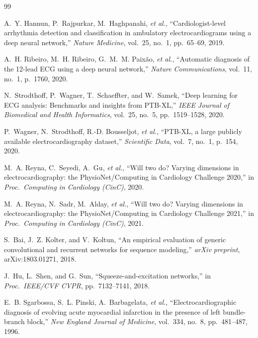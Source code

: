\documentclass[journal]{IEEEtran}
\begin{document}
\begin{thebibliography}{99}

A.~Y. Hannun, P.~Rajpurkar, M.~Haghpanahi, \textit{et al.},
``Cardiologist-level arrhythmia detection and classification in
ambulatory electrocardiograms using a deep neural network,''
\textit{Nature Medicine}, vol.~25, no.~1, pp.~65--69, 2019.

A.~H. Ribeiro, M.~H. Ribeiro, G.~M.~M. Paixão, \textit{et al.},
``Automatic diagnosis of the 12-lead ECG using a deep neural network,''
\textit{Nature Communications}, vol.~11, no.~1, p.~1760, 2020.

N.~Strodthoff, P.~Wagner, T.~Schaeffter, and W.~Samek,
``Deep learning for ECG analysis: Benchmarks and insights from PTB-XL,''
\textit{IEEE Journal of Biomedical and Health Informatics},
vol.~25, no.~5, pp.~1519--1528, 2020.

P.~Wagner, N.~Strodthoff, R.-D. Bousseljot, \textit{et al.},
``PTB-XL, a large publicly available electrocardiography dataset,''
\textit{Scientific Data}, vol.~7, no.~1, p.~154, 2020.

M.~A. Reyna, C.~Seyedi, A.~Gu, \textit{et al.},
``Will two do? Varying dimensions in electrocardiography:
the PhysioNet/Computing in Cardiology Challenge 2020,''
in \textit{Proc.\ Computing in Cardiology (CinC)}, 2020.

M.~A. Reyna, N.~Sadr, M.~Alday, \textit{et al.},
``Will two do? Varying dimensions in electrocardiography:
the PhysioNet/Computing in Cardiology Challenge 2021,''
in \textit{Proc.\ Computing in Cardiology (CinC)}, 2021.

S.~Bai, J.~Z. Kolter, and V.~Koltun,
``An empirical evaluation of generic convolutional and recurrent
networks for sequence modeling,''
\textit{arXiv preprint}, arXiv:1803.01271, 2018.

J.~Hu, L.~Shen, and G.~Sun,
``Squeeze-and-excitation networks,''
in \textit{Proc.\ IEEE/CVF CVPR}, pp.~7132--7141, 2018.

E.~B. Sgarbossa, S.~L. Pinski, A.~Barbagelata, \textit{et al.},
``Electrocardiographic diagnosis of evolving acute myocardial
infarction in the presence of left bundle-branch block,''
\textit{New England Journal of Medicine}, vol.~334, no.~8,
pp.~481--487, 1996.


\end{thebibliography}
\end{document}
